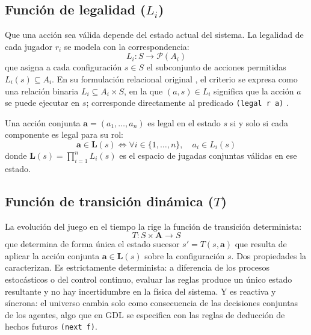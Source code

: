 \subsection{Función de legalidad (\texorpdfstring{$L_i$}{Li})}

Que una acción sea válida depende del estado actual del sistema. La legalidad de cada jugador $r_i$ se modela con la correspondencia:
\begin{equation}
    L_i : S \to \mathcal{P}(A_i)
    \label{eq:funcion-legalidad}
\end{equation}
que asigna a cada configuración $s \in S$ el subconjunto de acciones permitidas $L_i(s) \subseteq A_i$. En su formulación relacional original \cite{Genesereth2005GGP, GeneserethThielscher2014}, el criterio se expresa como una relación binaria $L_i \subseteq A_i \times S$, en la que $(a, s) \in L_i$ significa que la acción $a$ se puede ejecutar en $s$; corresponde directamente al predicado \texttt{(legal r a)} \cite{Love2008GDL}.

Una acción conjunta $\mathbf{a} = (a_1, \dots, a_n)$ es legal en el estado $s$ si y solo si cada componente es legal para su rol:
\begin{equation}
    \mathbf{a} \in \mathbf{L}(s) \iff \forall i \in \{1, \dots, n\}, \quad a_i \in L_i(s)
    \label{eq:accion-conjunta-legal}
\end{equation}
donde $\mathbf{L}(s) = \prod_{i=1}^n L_i(s)$ es el espacio de jugadas conjuntas válidas en ese estado.

\subsection{Función de transición dinámica (\texorpdfstring{$T$}{T})}

La evolución del juego en el tiempo la rige la función de transición determinista:
\begin{equation}
    T : S \times \mathbf{A} \to S
    \label{eq:funcion-transicion}
\end{equation}
que determina de forma única el estado sucesor $s' = T(s, \mathbf{a})$ que resulta de aplicar la acción conjunta $\mathbf{a} \in \mathbf{L}(s)$ sobre la configuración $s$. Dos propiedades la caracterizan. Es estrictamente determinista: a diferencia de los procesos estocásticos o del control continuo, evaluar las reglas produce un único estado resultante y no hay incertidumbre en la física del sistema. Y es reactiva y síncrona: el universo cambia solo como consecuencia de las decisiones conjuntas de los agentes, algo que en GDL se especifica con las reglas de deducción de hechos futuros \texttt{(next f)}.

